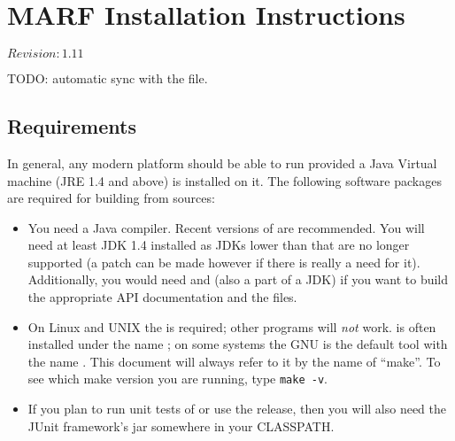 \chapter{MARF Installation Instructions}

$Revision: 1.11 $

\noindent
TODO: automatic sync with the  file.

\section{Requirements}

In general, any modern platform should be able to run {\marf} provided
a Java Virtual machine (JRE 1.4 and above) is installed on it.
The following software packages are required for building {\marf} from sources:

\begin{itemize}

\item
	You need a Java compiler. Recent
	versions of  are recommended.
	You will need at least JDK 1.4 installed as JDKs lower than that
	are no longer supported (a patch can be made however if there is really
	a need for it). Additionally,
	you would need  and  (also a part
	of a JDK) if you want to build the appropriate API documentation
	and the  files.

\item
	On Linux and UNIX the {\gnu}  \cite{gmake} is required; other
	 programs will {\em not} work.
	{\gnu}  is often installed under
	the name ; on some systems the GNU  is the
	default tool with the name . This document will always
	refer to it by the name of ``make''. To see which make version you
	are running, type \texttt{make -v}.

\item
	If you plan to run unit tests of {\marf} or use the 
	release, then you will also need the JUnit \cite{junit} framework's jar somewhere in
	your CLASSPATH.


\end{itemize}



